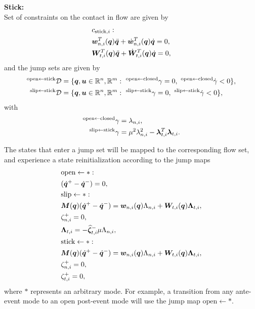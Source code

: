 \documentclass[../DC2017114Bouma.tex]{subfiles}
\begin{document}
\textbf{Stick:}\\
Set of constraints on the contact in flow are given by
\begin{align}
&c_{\text{stick},i}:\nonumber\\
&{\boldsymbol{w}}^T_{n,i}({\boldsymbol{q}})\ddot{{\boldsymbol{q}}} + \dot{{\boldsymbol{w}}}^T_{n,i}({\boldsymbol{q}})\dot{{\boldsymbol{q}}} = 0,\\
&{\boldsymbol{W}}^T_{t,i}({\boldsymbol{q}})\ddot{{\boldsymbol{q}}} + \dot{{\boldsymbol{W}}}^T_{t,i}({\boldsymbol{q}})\dot{{\boldsymbol{q}}} = 0,
\end{align}
and the jump sets are given by
\begin{align}
^{\text{open}\leftarrow \text{stick}}\mathcal{D} &= \{{\boldsymbol{q}},{\boldsymbol{u}}\in\mathbb{R}^n,\mathbb{R}^m:\ ^{\text{open}\leftarrow \text{closed}}\gamma = 0,\ ^{\text{open}\leftarrow \text{closed}}\dot{\gamma} < 0 \},\\
^{\text{slip}\leftarrow \text{stick}}\mathcal{D} &= \{{\boldsymbol{q}},{\boldsymbol{u}}\in\mathbb{R}^n,\mathbb{R}^m:\ ^{\text{slip}\leftarrow \text{stick}}\gamma = 0,\ ^{\text{slip}\leftarrow \text{stick}}\dot{\gamma} < 0 \},
\end{align}
with
\begin{align}
^{\text{open}\leftarrow \text{closed}}\gamma &= \lambda_{n,i},\\
^{\text{slip}\leftarrow \text{stick}}\gamma &= \mu^2\lambda_{n,i}^2 - \boldsymbol{\lambda}^T_{t,i}\boldsymbol{\lambda}_{t,i}.
\end{align}

The states that enter a jump set will be mapped to the corresponding flow set, and experience a state reinitialization according to the jump maps
\begin{align}
&\text{open}\leftarrow \ast:\nonumber\\
&(\dot{{\boldsymbol{q}}}^+ - \dot{{\boldsymbol{q}}}^-) = 0,\\
&\text{slip}\leftarrow\ast:\nonumber\\
&{\boldsymbol{M}}({\boldsymbol{q}})(\dot{{\boldsymbol{q}}}^+ - \dot{{\boldsymbol{q}}}^-) = {\boldsymbol{w}}_{n,i}({\boldsymbol{q}})\Lambda_{n,i} + {\boldsymbol{W}}_{t,i}({\boldsymbol{q}})\boldsymbol{\Lambda}_{t,i},\\
&\zeta_{n,i}^+=0,\\
&\boldsymbol{\Lambda}_{t,i} = -\widehat{\boldsymbol{\zeta}}^-_{t,i}\mu\Lambda_{n,i},\\
&\text{stick}\leftarrow \ast:\nonumber\\
&{\boldsymbol{M}}({\boldsymbol{q}})(\dot{{\boldsymbol{q}}}^+ - \dot{{\boldsymbol{q}}}^-) = {\boldsymbol{w}}_{n,i}({\boldsymbol{q}})\Lambda_{n,i} + {\boldsymbol{W}}_{t,i}({\boldsymbol{q}})\boldsymbol{\Lambda}_{t,i},\\
&\zeta_{n,i}^+=0,\\
&\zeta_{t,i}^+= 0,
\end{align}
where $\ast$ represents an arbitrary mode. For example, a transition from any ante-event mode to an open post-event mode will use the jump map $\text{open}\leftarrow \ast$.
\end{document}
